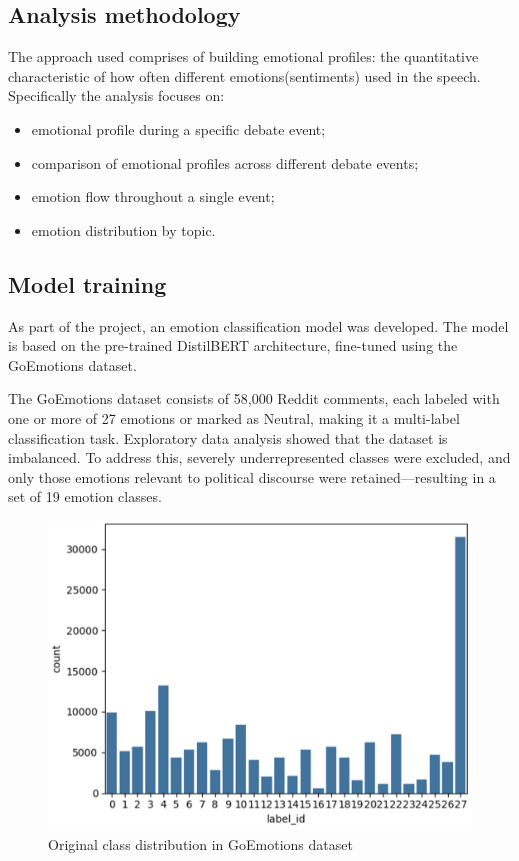 \documentclass[pdflatex,sn-mathphys-num]{sn-jnl}%
\begin{document}
\subsection{Analysis methodology}

The approach used comprises of building emotional profiles: the quantitative characteristic of how often different emotions(sentiments) used in the speech.
Specifically the analysis focuses on:
\begin{itemize}
	\item emotional profile during a specific debate event;
	\item comparison of emotional profiles across different debate events;
	\item emotion flow throughout a single event;
	\item emotion distribution by topic.
\end{itemize}

\subsection{Model training}

As part of the project, an emotion classification model was developed. The model is based on the pre-trained DistilBERT architecture, fine-tuned using the GoEmotions dataset. 

The GoEmotions dataset consists of 58,000 Reddit comments, each labeled with one or more of 27 emotions or marked as Neutral, making it a multi-label classification task.
Exploratory data analysis showed that the dataset is imbalanced. To address this, severely underrepresented classes were excluded, and only those emotions relevant to political discourse were retained—resulting in a set of 19 emotion classes.
\begin{figure}[h]
	\centering
	\includegraphics[width=13cm]{f1-label_distribution.png}
	\caption{Original class distribution in GoEmotions dataset}
\end{figure}
\end{document}

